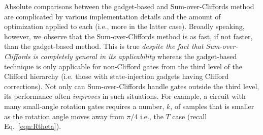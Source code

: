 Absolute comparisons between the gadget-based and Sum-over-Cliffords method are complicated by various implementation details and the amount of optimization applied to each (i.e., more in the latter case). Broadly speaking, however, we observe that the Sum-over-Cliffords method is as fast, if not faster, than the gadget-based method. This is true \emph{despite the fact that Sum-over-Cliffords is completely general in its applicability} whereas the gadget-based technique is only applicable for non-Clifford gates from the third level of the Clifford hierarchy (i.e. those with state-injection gadgets having Clifford corrections). Not only can Sum-over-Cliffords handle gates outside the third level, its performance often \emph{improves} in such situations. For example, a circuit with many small-angle rotation gates requires a number, $k$, of samples that is smaller as the rotation angle moves away from $\pi/4$ i.e., the $T$ case (recall  Eq.~\eqref{eqn:Rtheta}).

